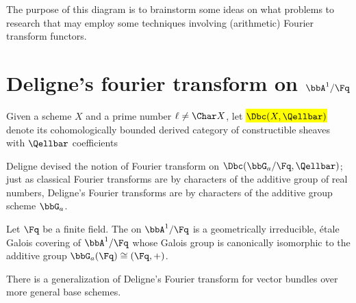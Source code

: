 The purpose of this diagram is to brainstorm some ideas on what problems to research that may employ some techniques involving (arithmetic) Fourier transform functors.

\section{Deligne's fourier transform on \texorpdfstring{$\bbA^1/\Fq$}{A1/Fq}}

Given a scheme $X$ and a prime number $\ell \neq \Char X$, let \hl{$\Dbc(X, \Qellbar)$} denote its cohomologically bounded derived category of constructible sheaves with $\Qellbar$ coefficients 

Deligne devised the notion of Fourier transform on $\Dbc(\bbG_a / \Fq, \Qellbar)$; just as classical Fourier transforms are by characters of the additive group of real numbers, Deligne's Fourier transforms are by characters of the additive group scheme $\bbG_a$.



\begin{lemma} \label{lemma:artin_schreier_morphism_has_galois_group_the_additive_group}
Let $\Fq$ be a finite field. The  on $\bbA^1/\Fq$ is a geometrically irreducible, \'etale Galois covering of $\bbA^1/\Fq$ whose Galois group is canonically isomorphic to the additive group $\bbG_a(\Fq) \cong (\Fq,+)$.
\end{lemma}



There is a generalization of Deligne's Fourier transform for vector bundles over more general base schemes. 

% 



